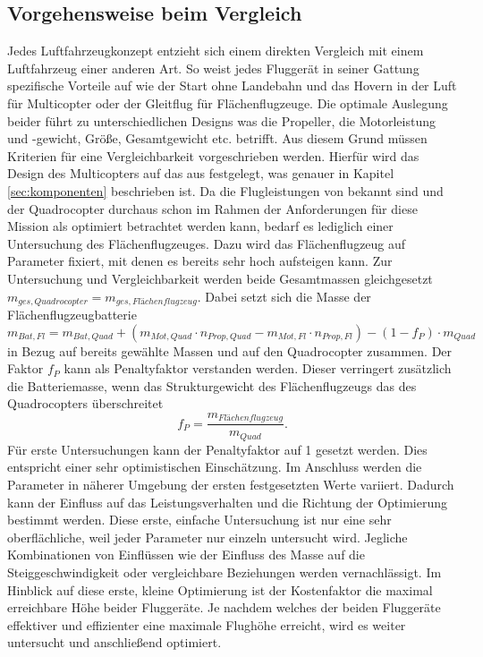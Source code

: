 \subsection{Vorgehensweise beim Vergleich}
\label{sec:vorgehenswiese_vergleich}
Jedes Luftfahrzeugkonzept entzieht sich einem direkten Vergleich mit einem Luftfahrzeug einer anderen Art. So weist jedes Fluggerät in seiner Gattung spezifische Vorteile auf wie der Start ohne Landebahn und das Hovern in der Luft für Multicopter oder der Gleitflug für Flächenflugzeuge. Die optimale Auslegung beider führt zu unterschiedlichen Designs was die Propeller, die Motorleistung und -gewicht, Größe, Gesamtgewicht etc. betrifft. Aus diesem Grund müssen Kriterien für eine Vergleichbarkeit vorgeschrieben werden. Hierfür wird das Design des Multicopters auf das aus \cite{Anderson.2018} festgelegt, was genauer in Kapitel \ref{sec:komponenten} beschrieben ist. Da die Flugleistungen von \cite{Anderson.2018} bekannt sind und der Quadrocopter durchaus schon im Rahmen der Anforderungen für diese Mission als optimiert betrachtet werden kann, bedarf es lediglich einer Untersuchung des Flächenflugzeuges. Dazu wird das Flächenflugzeug auf Parameter fixiert, mit denen es bereits sehr hoch aufsteigen kann. Zur Untersuchung und Vergleichbarkeit werden beide Gesamtmassen gleichgesetzt \ensuremath{m_{ges,Quadrocopter} = m_{ges,Flächenflugzeug}}. Dabei setzt sich die Masse der Flächenflugzeugbatterie   
\begin{equation}
	m_{Bat,Fl} = m_{Bat,Quad} + (m_{Mot,Quad}\cdot n_{Prop,Quad} - m_{Mot,Fl}\cdot n_{Prop,Fl}) - (1-f_P)\cdot m_{Quad}  
\end{equation}
in Bezug auf bereits gewählte Massen und auf den Quadrocopter zusammen. Der Faktor \ensuremath{f_P} kann als Penaltyfaktor verstanden werden. Dieser verringert zusätzlich die Batteriemasse, wenn das Strukturgewicht des Flächenflugzeugs das des Quadrocopters überschreitet
\begin{equation}
	f_P = \frac{m_{Flächenflugzeug}}{m_{Quad}}.
\end{equation} 
Für erste Untersuchungen kann der Penaltyfaktor auf 1 gesetzt werden. Dies entspricht einer sehr optimistischen Einschätzung. Im Anschluss werden die Parameter in näherer Umgebung der ersten festgesetzten Werte variiert. Dadurch kann der Einfluss auf das Leistungsverhalten und die Richtung der Optimierung bestimmt werden. Diese erste, einfache Untersuchung ist nur eine sehr oberflächliche, weil jeder Parameter nur einzeln untersucht wird. Jegliche Kombinationen von Einflüssen wie der Einfluss des Masse auf die Steiggeschwindigkeit oder vergleichbare Beziehungen werden vernachlässigt. Im Hinblick auf diese erste, kleine Optimierung ist der Kostenfaktor die maximal erreichbare Höhe beider Fluggeräte. Je nachdem welches der beiden Fluggeräte effektiver und effizienter eine maximale Flughöhe erreicht, wird es weiter untersucht und anschließend optimiert. 



